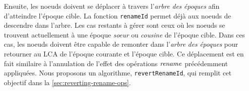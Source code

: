 Ensuite, les noeuds doivent se déplacer à travers l'\emph{arbre des époques} afin d'atteindre l'époque cible.
La fonction \texttt{renameId} permet déjà aux noeuds de descendre dans l'arbre.
Les cas restants à gérer sont ceux où les noeuds se trouvent actuellement à une époque \emph{soeur} ou \emph{cousine} de l'époque cible.
Dans ces cas, les noeuds doivent être capable de remonter dans l'\emph{arbre des époques} pour retourner au \ac{LCA} de l'époque courante et l'époque cible.
Ce déplacement est en fait similaire à l'annulation de l'effet des opérations $\mathit{rename}$ précédemment appliquées.
Nous proposons un algorithme, \texttt{revertRenameId}, qui remplit cet objectif dans la \autoref{sec:reverting-rename-ops}.
